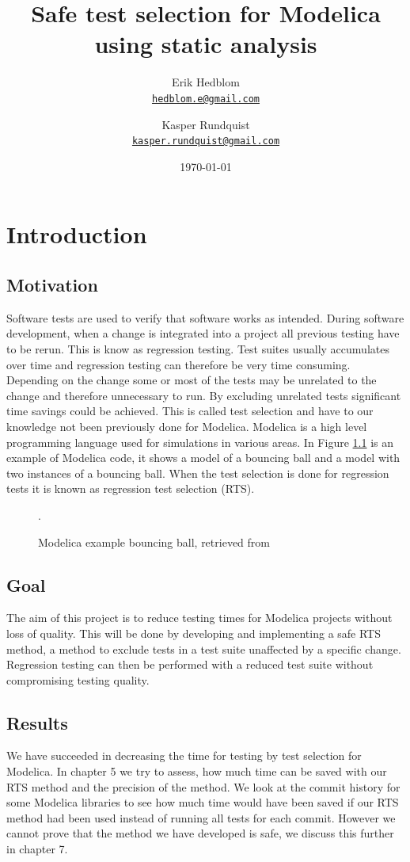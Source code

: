 \documentclass{cslthse-msc}
\author{
	Erik Hedblom \\
	{\normalsize \href{mailto:hedblom.e@gmail.com}{\texttt{hedblom.e@gmail.com}}}
	\and
	Kasper Rundquist \\
	{\normalsize \href{mailto:kasper.rundquist@gmail.com}{\texttt{kasper.rundquist@gmail.com}}}
}
\title{Safe test selection for Modelica using static analysis}
\date{\today}
\begin{document}
\makefrontmatter
\chapter[Introduction]{Introduction}

\section{Motivation}
Software tests are used to verify that software works as intended.
During software development, when a change is integrated into a project all previous testing have to be rerun. \cite{DBLP:conf/sigsoft/LegunsenHSLZM16, haider2016safe} This is know as regression testing. Test suites usually accumulates over time and regression testing can therefore be very time consuming. Depending on the change some or most of the tests may be unrelated to the change and therefore unnecessary to run. By excluding unrelated tests significant time savings could be achieved. This is called test selection and have to our knowledge not been previously done for Modelica. Modelica is a high level programming language used for simulations in various areas. In Figure \ref{fig:bouncingBallCode} is an example of Modelica code, it shows a model of a bouncing ball and a model with two instances of a bouncing ball. When the test selection is done for regression tests it is known as regression test selection (RTS). 

\begin{figure}[!htbp]
    \centering
    {}
    \caption{Modelica example bouncing ball, retrieved from \cite{aakesson2010implementation}}.
    \label{fig:bouncingBallCode}
\end{figure}

\section{Goal}
The aim of this project is to reduce testing times for Modelica projects without loss of quality. This will be done by developing and implementing a safe RTS method, a method to exclude tests in a test suite unaffected by a specific change. \cite{DBLP:conf/pppj/OqvistHM16} Regression testing can then be performed with a reduced test suite without compromising testing quality.

\section{Results}
We have succeeded in decreasing the time for testing by test selection for Modelica. In chapter 5 we try to assess, how much time can be saved with our RTS method and the precision of the method. We look at the commit history for some Modelica libraries to see how much time would have been saved if our RTS method had been used instead of running all tests for each commit. However we cannot prove that the method we have developed is safe, we discuss this further in chapter 7.
\end{document}
